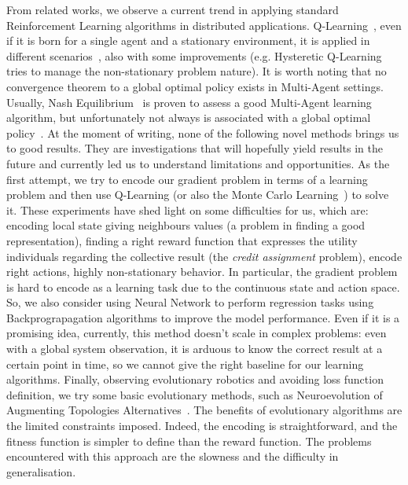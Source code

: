 \documentclass[conference]{IEEEtran}
\begin{document}
From related works, we observe a current trend in applying standard Reinforcement Learning algorithms in distributed applications.
Q-Learning~\cite{DBLP:journals/ras/Krose95}, even if it is born for a single agent and a stationary environment, it is applied in different scenarios~\cite{DBLP:conf/mass/ShahK07}, also with some improvements (e.g. Hysteretic Q-Learning~\cite{DBLP:conf/iros/MatignonLF07} tries to manage the non-stationary problem nature).
It is worth noting that no convergence theorem to a global optimal policy exists in Multi-Agent settings. 
Usually, Nash Equilibrium~\cite{DBLP:conf/icml/HuW98} is proven to assess a good Multi-Agent learning algorithm, but unfortunately not always is associated with a global optimal policy~\cite{DBLP:conf/uai/PeshkinKMK00}.
%
At the moment of writing, none of the following novel methods brings us to good results. They are investigations that will hopefully yield results in the future and currently led us to understand limitations and opportunities.
%
As the first attempt, we try to encode our gradient problem in terms of a learning problem and then use Q-Learning (or also the Monte Carlo Learning~\cite{DBLP:conf/nips/Thrun99}) to solve it.
These experiments have shed light on some difficulties for us, which are: encoding local state giving neighbours values (a problem in finding a good representation), finding a right reward function that expresses the utility individuals
regarding the collective result (the \emph{credit assignment} problem), encode right actions, highly non-stationary behavior. 
%
In particular, the gradient problem is hard to encode as a learning task due to the continuous state and action space.
So, we also consider using Neural Network to perform regression tasks using Backprograpagation algorithms to
improve the model performance. 
Even if it is a promising idea, currently, this method doesn't scale in complex problems: even with a global system observation, it is arduous to know the correct result at a certain point in time, so 
we cannot give the right baseline for our learning algorithms.
%
Finally, observing evolutionary robotics and avoiding loss function definition, we try some basic evolutionary methods, such as Neuroevolution of Augmenting Topologies Alternatives~\cite{DBLP:journals/ec/StanleyM02}.
The benefits of evolutionary algorithms are the limited constraints imposed. Indeed, the encoding is straightforward, and the fitness function is simpler to define than the reward function.
The problems encountered with this approach are the slowness and the difficulty in generalisation.
%
\end{document}
